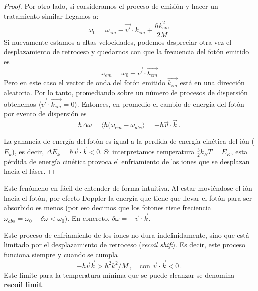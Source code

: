 \begin{proof}
        Por otro lado, si consideramos el proceso de emisión y hacer un tratamiento similar llegamos a:
        	\begin{equation}
        	\omega_0 = \omega_{em} - \vec{v'} \cdot \vec{k_{em}} + \frac{\hbar k_{em}^2}{2M}
        	\end{equation}
        Si nuevamente estamos a altas velocidades, podemos despreciar otra vez el desplazamiento de retroceso y quedarnos con que la frecuencia del fotón emitido es
        	\begin{equation}
        	\omega_{em} = \omega_0 + \vec{v'} \cdot \vec{k_{em}}
        	\end{equation}
        Pero en este caso el vector de onda del fotón emitido $\vec{k_{em}}$ está en una dirección aleatoria. Por lo tanto, promediando sobre un número de procesos de dispersión obtenemos $\langle \vec{v'} \cdot \vec{k_{em}} = 0 \rangle$. Entonces, en promedio el cambio de energía del fotón por evento de dispersión es
        	\begin{equation}
        	\hbar \Delta \omega = \langle \hbar (\omega_{em}-\omega_{abs} \rangle = - \hbar \vec{v} \cdot \vec{k} \, .
        	\end{equation}
        
        La ganancia de energía del fotón es igual a la perdida de energía cinética del ión ($E_k$), es decir, $\Delta E_k = \hbar \vec{v} \cdot \vec{k} < 0$. Si interpretamos temperatura $\frac{3}{2} k_B T = E_K$, esta pérdida de energía cinética provoca el enfriamiento de los iones que se desplazan hacia el láser.
    
    \end{proof}
    



Este fenómeno en fácil de entender de forma intuitiva. Al estar moviéndose el ión hacia el fotón, por efecto Doppler la energía que tiene que llevar el fotón para ser absorbido es menos (por eso decimos que los fotones tiene freciencia $\omega_{abs} =  \omega_0 - \delta \omega < \omega_0$). En concreto, $\delta \omega = - \vec{v} \cdot \vec{k}$. 

Este proceso de enfriamiento de los iones no dura indefinidamente, sino que está limitado por el desplazamiento de retroceso (\textit{recoil shift}). Es decir, este proceso funciona siempre y cuando se cumpla 
	\begin{equation}
 	-h \vec{v} \vec{k} > \hbar^2 k^2/M\,, \quad \text{con } \vec{v} \cdot \vec{k} < 0 \,.
 	\end{equation} 
Este límite para la temperatura mínima que se puede alcanzar se denomina \textbf{recoil limit}.




